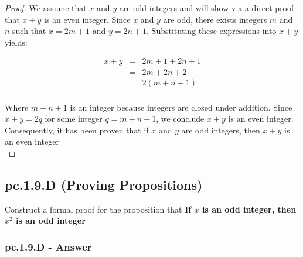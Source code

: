 \begin{proof}

We assume that $x$ and $y$ are odd integers and will show via a direct proof that $x + y$ is an even integer. Since $x$ and $y$ are odd, there exists integers $m$ and $n$ such that $x = 2m + 1$ and $y = 2n + 1$. Substituting these expressions into $x + y$ yields:

\begin{eqnarray*}
x + y & = & 2m + 1 + 2n + 1 \nonumber \\
& = & 2m + 2n + 2 \nonumber \\
& = & 2(m + n + 1) \nonumber \\
\end{eqnarray*}

Where $m + n + 1$ is an integer because integers are closed under addition. Since $x + y = 2q$ for some integer $q = m + n + 1$, we conclude $x + y$ is an even integer. Consequently, it has been proven that if $x$ and $y$ are odd integers, then $x + y$ is an even integer \\

\end{proof}


\newpage
\subsection{pc.1.9.D (Proving Propositions)}

Construct a formal proof for the proposition that {\bf If $x$ is an odd integer, then $x^2$ is an odd integer}

\subsubsection*{pc.1.9.D - Answer}

